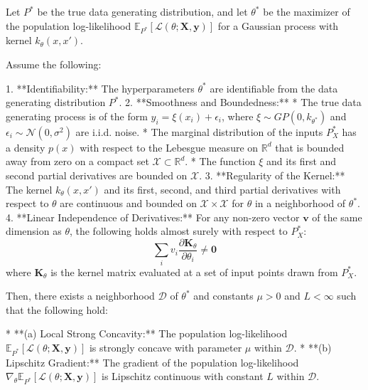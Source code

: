 \begin{theorem}\label{thm:local-strong-concavity-general}
Let $P^*$ be the true data generating distribution, and let $\theta^*$ be the maximizer of the population log-likelihood $\mathbb{E}_{P^*}[\mathcal{L}(\theta; \mathbf{X}, \mathbf{y})]$ for a Gaussian process with kernel $k_\theta(x, x')$.

Assume the following:

1.  **Identifiability:** The hyperparameters $\theta^*$ are identifiable from the data generating distribution $P^*$.
2.  **Smoothness and Boundedness:**
    *   The true data generating process is of the form $y_i = \xi(x_i) + \epsilon_i$, where $\xi \sim GP(0, k_{\theta^*})$ and $\epsilon_i \sim \mathcal{N}(0, \sigma^2)$ are i.i.d. noise.
    *   The marginal distribution of the inputs $P^*_X$ has a density $p(x)$ with respect to the Lebesgue measure on $\mathbb{R}^d$ that is bounded away from zero on a compact set $\mathcal{X} \subset \mathbb{R}^d$.
    *   The function $\xi$ and its first and second partial derivatives are bounded on $\mathcal{X}$.
3.  **Regularity of the Kernel:** The kernel $k_\theta(x,x')$ and its first, second, and third partial derivatives with respect to $\theta$ are continuous and bounded on $\mathcal{X} \times \mathcal{X}$ for $\theta$ in a neighborhood of $\theta^*$.
4. **Linear Independence of Derivatives:** For any non-zero vector $\mathbf{v}$ of the same dimension as $\theta$, the following holds almost surely with respect to $P^*_X$:
    $$
    \sum_{i} v_i \frac{\partial \mathbf{K}_\theta}{\partial \theta_i} \neq \mathbf{0}
    $$
    where $\mathbf{K}_\theta$ is the kernel matrix evaluated at a set of input points drawn from $P^*_X$.

Then, there exists a neighborhood $\mathcal{D}$ of $\theta^*$ and constants $\mu > 0$ and $L < \infty$ such that the following hold:

*   **(a) Local Strong Concavity:** The population log-likelihood $\mathbb{E}_{P^*}[\mathcal{L}(\theta; \mathbf{X}, \mathbf{y})]$ is strongly concave with parameter $\mu$ within $\mathcal{D}$.
*   **(b) Lipschitz Gradient:** The gradient of the population log-likelihood $\nabla_\theta \mathbb{E}_{P^*}[\mathcal{L}(\theta; \mathbf{X}, \mathbf{y})]$ is Lipschitz continuous with constant $L$ within $\mathcal{D}$.
\end{theorem}
